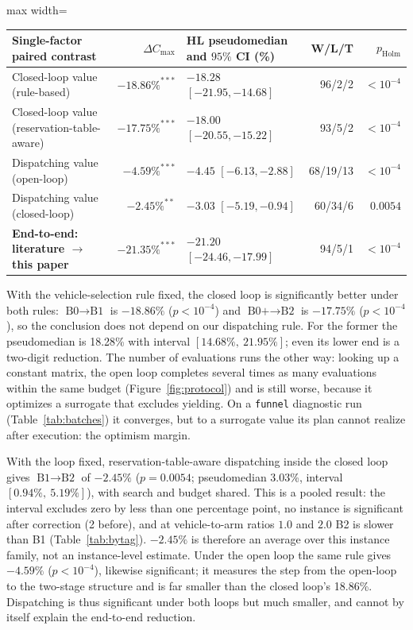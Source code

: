 \documentclass[preprint,review,12pt,authoryear,doubleblind]{elsarticle}
\newcommand{\GainLoopRule}{18.86\%}      %
\newcommand{\PLoopRule}{<10^{-4}}
\newcommand{\GainLoopProbe}{17.75\%}     %
\newcommand{\PLoopProbe}{<10^{-4}}
\newcommand{\GainProbeOpen}{4.59\%}      %
\newcommand{\PProbeOpen}{<10^{-4}}
\newcommand{\GainProbeLoop}{2.45\%}      %
\newcommand{\PProbeLoop}{=0.0054}
\newcommand{\HLLoopRule}{18.28\%}
\newcommand{\CILoopRule}{$[14.68\%,\ 21.95\%]$}
\newcommand{\HLProbeLoop}{3.03\%}
\newcommand{\CIProbeLoop}{$[0.94\%,\ 5.19\%]$}
\newcommand{\CellsSigProbe}{2}
\begin{document}
\begin{table}[!htbp]
\vspace{0.6em}

\begin{adjustbox}{max width=\linewidth}\begin{tabular}{@{}lrlrr@{}}
\toprule
Single-factor paired contrast & $\Delta C_{\max}$ & HL pseudomedian and $95\%$ CI (\%) & W/L/T & $p_{\mathrm{Holm}}$ \\
\midrule
Closed-loop value (rule-based) & $-18.86\%^{***}$ & $-18.28$ $[-21.95,-14.68]$ & 96/2/2 & $<10^{-4}$ \\
Closed-loop value (reservation-table-aware) & $-17.75\%^{***}$ & $-18.00$ $[-20.55,-15.22]$ & 93/5/2 & $<10^{-4}$ \\
Dispatching value (open-loop) & $-4.59\%^{***}$ & $-4.45$ $[-6.13,-2.88]$ & 68/19/13 & $<10^{-4}$ \\
Dispatching value (closed-loop) & $-2.45\%^{**}$ & $-3.03$ $[-5.19,-0.94]$ & 60/34/6 & $0.0054$ \\
\midrule
\textbf{End-to-end: literature $\rightarrow$ this paper} & $-21.35\%^{***}$ & $-21.20$ $[-24.46,-17.99]$ & 94/5/1 & $<10^{-4}$ \\
\bottomrule
\end{tabular}\end{adjustbox}
\end{table}

With the vehicle-selection rule fixed, the closed loop is significantly better under both rules: $\text{B0}\to\text{B1}$ is $-\GainLoopRule$ ($p\PLoopRule$) and $\text{B0+}\to\text{B2}$ is $-\GainLoopProbe$ ($p\PLoopProbe$), so the conclusion does not depend on our dispatching rule.
For the former the pseudomedian is \HLLoopRule{} with interval \CILoopRule{}; even its lower end is a two-digit reduction.
The number of evaluations runs the other way: looking up a constant matrix, the open loop completes several times as many evaluations within the same budget (Figure~\ref{fig:protocol}) and is still worse, because it optimizes a surrogate that excludes yielding.
On a \texttt{funnel} diagnostic run (Table~\ref{tab:batches}) it converges, but to a surrogate value its plan cannot realize after execution: the optimism margin.

With the loop fixed, reservation-table-aware dispatching inside the closed loop gives $\text{B1}\to\text{B2}$ of $-\GainProbeLoop$ ($p\PProbeLoop$; pseudomedian \HLProbeLoop{}, interval \CIProbeLoop{}), with search and budget shared.
This is a pooled result: the interval excludes zero by less than one percentage point, no instance is significant after correction (\CellsSigProbe{} before), and at vehicle-to-arm ratios $1.0$ and $2.0$ B2 is slower than B1 (Table~\ref{tab:bytag}).
$-\GainProbeLoop$ is therefore an average over this instance family, not an instance-level estimate.
Under the open loop the same rule gives $-\GainProbeOpen$ ($p\PProbeOpen$), likewise significant; it measures the step from the open-loop to the two-stage structure and is far smaller than the closed loop's \GainLoopRule{}.
Dispatching is thus significant under both loops but much smaller, and cannot by itself explain the end-to-end reduction.
\end{document}
